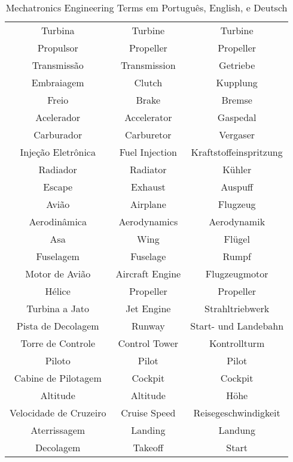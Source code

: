 \begin{table}[ht]
\begin{tabular}{|c|c|c|}
    Turbina & Turbine & Turbine \\
    Propulsor & Propeller & Propeller \\
    Transmissão & Transmission & Getriebe \\
    Embraiagem & Clutch & Kupplung \\
    Freio & Brake & Bremse \\
    Acelerador & Accelerator & Gaspedal \\
    Carburador & Carburetor & Vergaser \\
    Injeção Eletrônica & Fuel Injection & Kraftstoffeinspritzung \\
    Radiador & Radiator & Kühler \\
    Escape & Exhaust & Auspuff \\
    Avião & Airplane & Flugzeug \\
    Aerodinâmica & Aerodynamics & Aerodynamik \\
    Asa & Wing & Flügel \\
    Fuselagem & Fuselage & Rumpf \\
    Motor de Avião & Aircraft Engine & Flugzeugmotor \\
    Hélice & Propeller & Propeller \\
    Turbina a Jato & Jet Engine & Strahltriebwerk \\
    Pista de Decolagem & Runway & Start- und Landebahn \\
    Torre de Controle & Control Tower & Kontrollturm \\
    Piloto & Pilot & Pilot \\
    Cabine de Pilotagem & Cockpit & Cockpit \\
    Altitude & Altitude & Höhe \\
    Velocidade de Cruzeiro & Cruise Speed & Reisegeschwindigkeit \\
    Aterrissagem & Landing & Landung \\
    Decolagem & Takeoff & Start 
    \hline
    \end{tabular}
    \caption{Mechatronics Engineering Terms em Português, English, e Deutsch}
    \label{table:mechatronics_terms}
    \end{table}